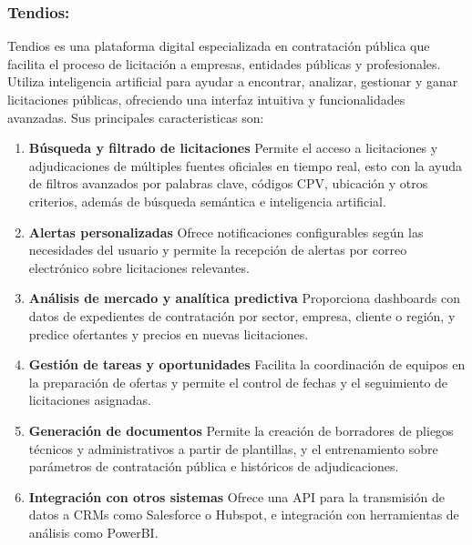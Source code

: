 \documentclass{article}
\begin{document}
  \subsubsection{Tendios:} 
  Tendios es una plataforma digital especializada en contratación pública que facilita el proceso de licitación a empresas, entidades públicas y profesionales. Utiliza inteligencia artificial para ayudar a encontrar, analizar, gestionar y ganar licitaciones públicas, ofreciendo una interfaz intuitiva y funcionalidades avanzadas.
  Sus principales caracteristicas son:

\begin{enumerate}
\item \textbf{Búsqueda y filtrado de licitaciones}  
\newline
Permite el acceso a licitaciones y adjudicaciones de múltiples fuentes oficiales en tiempo real, esto con la ayuda de filtros avanzados por palabras clave, códigos CPV, ubicación y otros criterios, además de búsqueda semántica e inteligencia artificial.

\item \textbf{Alertas personalizadas}  
\newline
Ofrece notificaciones configurables según las necesidades del usuario y permite la recepción de alertas por correo electrónico sobre licitaciones relevantes.

\item \textbf{Análisis de mercado y analítica predictiva}  
\newline
Proporciona dashboards con datos de expedientes de contratación por sector, empresa, cliente o región, y predice ofertantes y precios en nuevas licitaciones.

\item \textbf{Gestión de tareas y oportunidades}  
\newline
Facilita la coordinación de equipos en la preparación de ofertas y permite el control de fechas y el seguimiento de licitaciones asignadas.

\item \textbf{Generación de documentos}  
\newline
Permite la creación de borradores de pliegos técnicos y administrativos a partir de plantillas, y el entrenamiento sobre parámetros de contratación pública e históricos de adjudicaciones.

\item \textbf{Integración con otros sistemas}  
\newline
Ofrece una API para la transmisión de datos a CRMs como Salesforce o Hubspot, e integración con herramientas de análisis como PowerBI.


\end{enumerate}
\end{document}
